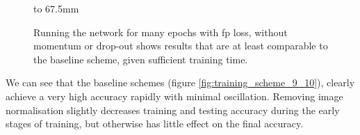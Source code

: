 \begin{figure}[p]
{    }
    \hspace{0mm}
    \hbox to 67.5mm{}%
    \caption[The results of the twelfth training scheme]{Running the network for many epochs with \gls{fp} loss, without momentum or drop-out shows results that are at least comparable to the baseline scheme, given sufficient training time.}
    \label{fig:training_scheme_12}
\end{figure}

We can see that the baseline schemes (figure \ref{fig:training_scheme_9_10}), clearly achieve a very high accuracy rapidly with minimal oscillation. Removing image normalisation slightly decreases training and testing accuracy during the early stages of training, but otherwise has little effect on the final accuracy.
\bigskip

%
